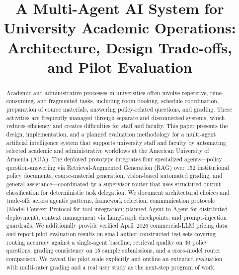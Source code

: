 \documentclass[conference]{IEEEtran}
\begin{document}
\title{A Multi-Agent AI System for University Academic Operations: Architecture, Design Trade-offs, and Pilot Evaluation}

\author{%
\and
{}
%
}

\maketitle

\begin{abstract}
Academic and administrative processes in universities often involve repetitive, time-consuming, and fragmented tasks, including room booking, schedule coordination, preparation of course materials, answering policy-related questions, and grading. These activities are frequently managed through separate and disconnected systems, which reduces efficiency and creates difficulties for staff and faculty. This paper presents the design, implementation, and a planned evaluation methodology for a multi-agent artificial intelligence system that supports university staff and faculty by automating selected academic and administrative workflows at the American University of Armenia (AUA). The deployed prototype integrates four specialized agents---policy question-answering via Retrieval-Augmented Generation (RAG) over 152 institutional policy documents, course-material generation, vision-based automated grading, and general assistance---coordinated by a supervisor router that uses structured-output classification for deterministic task delegation. We document architectural choices and trade-offs across agentic patterns, framework selection, communication protocols (Model Context Protocol for tool integration; planned Agent-to-Agent for distributed deployment), context management via LangGraph checkpoints, and prompt-injection guardrails. We additionally provide verified April~2026 commercial-LLM pricing data and report pilot evaluation results on small author-constructed test sets covering routing accuracy against a single-agent baseline, retrieval quality on 30 policy questions, grading consistency on 15 sample submissions, and a cross-model router comparison. We caveat the pilot scale explicitly and outline an extended evaluation with multi-rater grading and a real user study as the next-step program of work.
\end{abstract}
\end{document}
